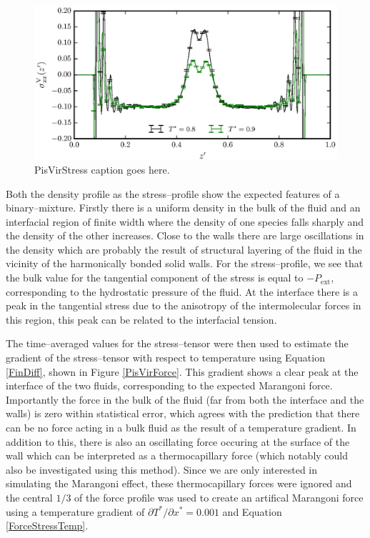 \begin{figure}[h]
\centering
\includegraphics[scale=0.8]{PisVirStress}
\caption{PisVirStress caption goes here.}
\label{PisVirStress}
\end{figure}

Both the density profile as the stress--profile show the expected features of a binary--mixture. 
Firstly there is a uniform density in the bulk of the fluid and an interfacial region of finite width where the density of one species falls sharply and the density of the other increases.
Close to the walls there are large oscillations in the density which are probably the result of structural layering of the fluid in the vicinity of the harmonically bonded solid walls.
For the stress--profile, we see that the bulk value for the tangential component of the stress is equal to $-P_{\mathrm{ext}}$, corresponding to the hydrostatic pressure of the fluid.
At the interface there is a peak in the tangential stress due to the anisotropy of the intermolecular forces in this region, this peak can be related to the interfacial tension.\cite{Marchand2011}

\FloatBarrier
The time--averaged values for the stress--tensor were then used to estimate the gradient of the stress--tensor with respect to temperature using Equation \ref{FinDiff}, shown in Figure \ref{PisVirForce}.
This gradient shows a clear peak at the interface of the two fluids, corresponding to the expected Marangoni force.
Importantly the force in the bulk of the fluid (far from both the interface and the walls) is zero within statistical error, which agrees with the prediction that there can be no force acting in a bulk fluid as the result of a temperature gradient.
In addition to this, there is also an oscillating force occuring at the surface of the wall which can be interpreted as a thermocapillary force (which notably could also be investigated using this method).
Since we are only interested in simulating the Marangoni effect, these thermocapillary forces were ignored and the central $1/3$ of the force profile was used to create an artifical Marangoni force using a temperature gradient of $\partial T^{*} / \partial x^{*} = 0.001$ and Equation \ref{ForceStressTemp}.

